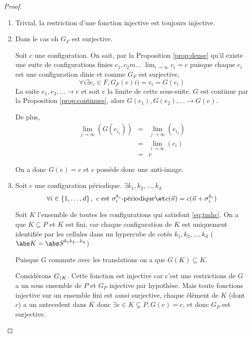 \begin{proof}
	\begin{enumerate}
		\item Trivial, la restriction d'une fonction injective est toujours injective.
		\item Dans le cas oh $G_F$ est surjective.

		      Soit $c$ une configuration. On sait, par la Proposition \ref{prop:dense} qu'il existe
		      une suite de configurations finies $c_1, c_2m \ldots$ \tlq $\lim_{i \to \infty} c_i = c$
		      puisque chaque $c_i$ est une configuration dinie et comme $G_F$ est surjective,
		      $$\forall i \exists e_i \in F, G_F(e)i) = c_i = G(e_i)$$
		      La suite $e_1, e_2, \ldots \to e$
		      et soit $e$ la limite de cette sous-suite. $G$ est continue par la Proposition \ref{prop:continues}, alors
		      $G(e_1), G(e_2), \ldots \to G(e)$.

		      De plus,
		      \begin{eqnarray*}
			      \lim_{j \to \infty} (G(e_{i_j})) &=& \lim_{j \to \infty} (e_{i_j}) \\
			      &=& \lim_{i \to \infty} (c_i) \\
			      &=& c
		      \end{eqnarray*}

		      On a donc $G(e) = c$ et $c$ possède donc une anti-image.
		\item Soit $c$ une configuration périodique.
		      $\exists k_1, k_2, \ldots, k_d$ \tlq
		      \begin{equation}
			      \forall i \in \enum 1 d, \ c \text{ est }\sigma_i^{k_i}\text{-périodique} \et
			      c(\vec n) = c(\vec n + \sigma_i^{k_i})
			      \label{eq:tmhc}
		      \end{equation}

		      Soit $K$ l'ensemble de toutes les configurations qui satisfont \ref{eq:tmhc}. On a que $K \subseteq P$ et $K$ est fini,
		      car chaque configuration de $K$ est uniquement identifiée par les cellules dans un hypercube de cotés $k_1, k_2, \ldots, k_d$
		      ($\abs K = {\abs S}^{k_1k_2\ldots k_d}$)

		      Puisque $G$ commute avec les translations on a que $G(K) \subseteq K$.

		      Considérons $G_{\restriction K}$. Cette fonction est injective car c'est une restrictions de $G$ a un
		      sous ensemble de $P$ et $G_P$ injective par hypothèse.
		      Mais toute fonctions injective sur un ensemble fini est aussi surjective,
		      \cad chaque élément de $K$ (dont $c$) a un antecedent dans $K$
		      donc $\exists e \in K \subsetneq P, G(e) = c$, et donc $G_P$ est surjective.
	\end{enumerate}
\end{proof}

